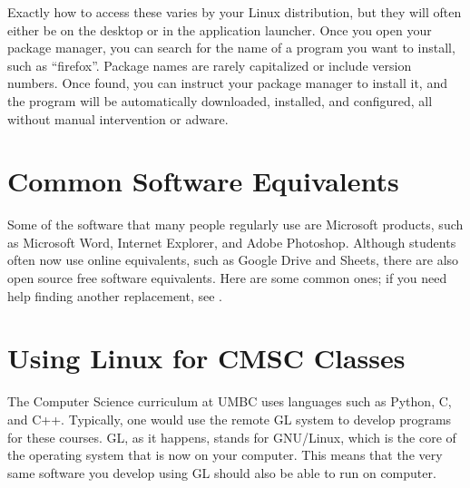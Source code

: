\documentclass[11pt,notumble]{leaflet}
\begin{document}
Exactly how to access these varies by your Linux distribution, but they will
often either be on the desktop or in the application launcher. Once you open
your package manager, you can search for the name of a program you want to
install, such as ``firefox''. Package names are rarely capitalized or include
version numbers. Once found, you can instruct your package manager to install
it, and the program will be automatically downloaded, installed, and configured,
all without manual intervention or adware.


\section{Common Software Equivalents}
\label{section:common-software-equivalents}

Some of the software that many people regularly use are Microsoft products, such
as Microsoft Word, Internet Explorer, and Adobe Photoshop. Although students
often now use online equivalents, such as Google Drive and Sheets, there are
also open source free software equivalents. Here are some common ones; if you
need help finding another replacement, see .



\section{Using Linux for CMSC Classes}
\label{section:linux-for-cmsc}

The Computer Science curriculum at UMBC uses languages such as Python, C, and
C++. Typically, one would use the remote GL system to develop programs for these
courses. GL, as it happens, stands for GNU/Linux, which is the core of the
operating system that is now on your computer. This means that the very same
software you develop using GL should also be able to run on computer.
\end{document}
